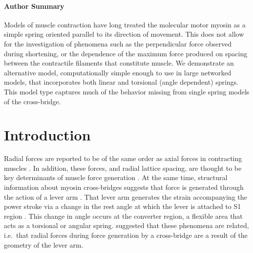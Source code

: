 \documentclass[]{article}
\begin{document}
\paragraph*{Author Summary} %
Models of muscle contraction have long treated the molecular motor myosin as a simple spring oriented parallel to its direction of movement. 
This does not allow for the investigation of phenomena such as the perpendicular force observed during shortening, or the dependence of the maximum force produced on spacing between the contractile filaments that constitute muscle.
We demonstrate an alternative model, computationally simple enough to use in large networked models, that incorporates both linear and torsional (angle dependent) springs. 
This model type captures much of the behavior missing from single spring models of the cross-bridge.


\section*{Introduction} %


Radial forces are reported to be of the same order as axial forces in contracting muscles \citep{Cecchi1990, Millman1998}. 
In addition, these forces, and radial lattice spacing, are thought to be key determinants of muscle force generation \citep{Fuchs2005}. 
At the same time, structural information about myosin cross-bridges suggests that force is generated through the action of a lever arm \citep{Rayment1993, Uyeda1996, Huxley2000}.
That lever arm generates the strain accompanying the power stroke via a change in the rest angle at which the lever is attached to S1 region \citep{Huxley2000, Houdusse2001}. 
This change in angle occurs at the converter region, a flexible area that acts as a torsional or angular spring. 
\citet{Schoenberg1980b} suggested that these phenomena are related, i.e.\ that radial forces during force generation by a cross-bridge are a result of the geometry of the lever arm. 
\end{document}

